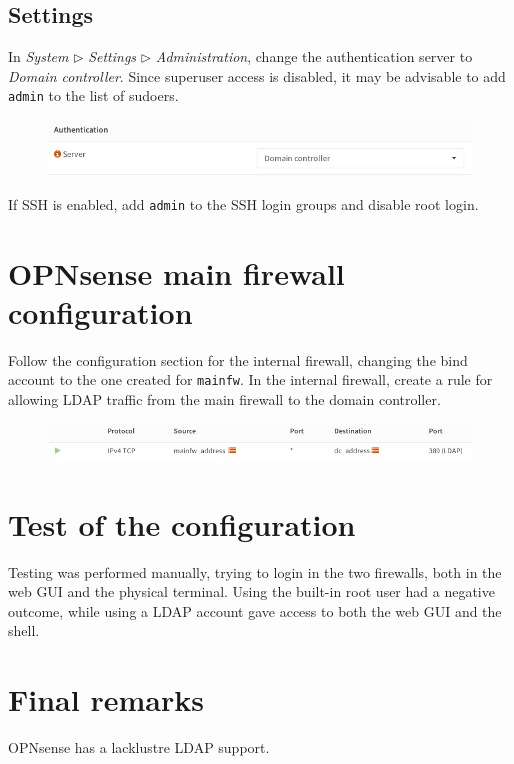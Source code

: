 \documentclass[draft]{homework}
\newcommand{\opn}{OPNsense\xspace}
\begin{document}
    \subsection{Settings}
    In \textit{System} $\triangleright$ \textit{Settings} $\triangleright$ \textit{Administration}, change the authentication server to \textit{Domain controller}.
    Since superuser access is disabled, it may be advisable to add \texttt{admin} to the list of sudoers.
    \begin{figure}[H]
        \centering
        \includegraphics[width=\linewidth]{images/settings}
        \label{fig:settings}
    \end{figure}
    
    If SSH is enabled, add \texttt{admin} to the SSH login groups and disable root login.
    
    
    \section{\opn main firewall configuration}
    Follow the configuration section for the internal firewall, changing the bind account to the one created for \texttt{mainfw}.
    In the internal firewall, create a rule for allowing LDAP traffic from the main firewall to the domain controller.
    \begin{figure}[H]
        \centering
        \includegraphics[width=\linewidth]{images/rule}
        \label{fig:rule}
    \end{figure}
    
    
    \section{Test of the configuration}
    Testing was performed manually, trying to login in the two firewalls, both in the web GUI and the physical terminal.
    Using the built-in root user had a negative outcome, while using a LDAP account gave access to both the web GUI and the shell.
    
    
    \section{Final remarks}
    \opn has a lacklustre LDAP support.
    
\end{document}
